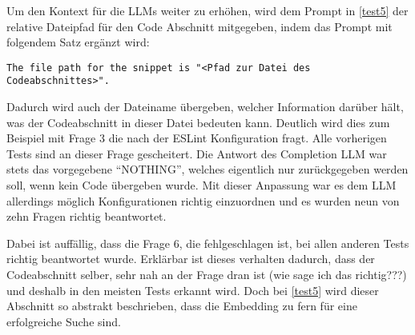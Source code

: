 \documentclass[../main.tex]{subfiles}
\begin{document}
Um den Kontext für die \glspl{LLM} weiter zu erhöhen, wird dem Prompt in \ref{test5} der relative Dateipfad für den Code Abschnitt mitgegeben, indem das Prompt mit folgendem Satz ergänzt wird:
\begin{center}
\begin{lstlisting}
The file path for the snippet is "<Pfad zur Datei des Codeabschnittes>".
\end{lstlisting}
\end{center}
Dadurch wird auch der Dateiname übergeben, welcher Information darüber hält, was der Codeabschnitt in dieser Datei bedeuten kann.
Deutlich wird dies zum Beispiel mit Frage 3 die nach der ESLint Konfiguration fragt.
Alle vorherigen Tests sind an dieser Frage gescheitert.
Die Antwort des Completion \gls{LLM} war stets das vorgegebene \enquote{NOTHING}, welches eigentlich nur zurückgegeben werden soll, wenn kein Code übergeben wurde.
Mit dieser Anpassung war es dem \gls{LLM} allerdings möglich Konfigurationen richtig einzuordnen und es wurden neun von zehn Fragen richtig beantwortet.

Dabei ist auffällig, dass die Frage 6, die fehlgeschlagen ist, bei allen anderen Tests richtig beantwortet wurde.
Erklärbar ist dieses verhalten dadurch, dass der Codeabschnitt selber, sehr nah an der Frage dran ist (wie sage ich das richtig???) und deshalb in den meisten Tests erkannt wird.
Doch bei \ref{test5} wird dieser Abschnitt so abstrakt beschrieben, dass die Embedding zu fern für eine erfolgreiche Suche sind.
\end{document}
